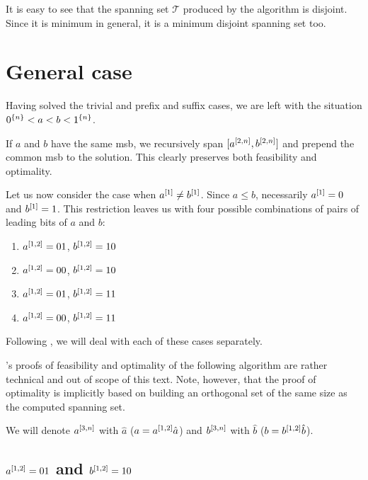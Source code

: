 It is easy to see that the spanning set $\mathcal{T}$
produced by the algorithm is disjoint.
Since it is minimum in general,
it is a minimum disjoint spanning set too.

\section{General case}

Having solved the trivial and prefix and suffix cases,
we are left with the situation
$0^{\{n\}} < a < b < 1^{\{n\}}$.

If $a$ and $b$ have the same \acrshort{msb},
we recursively span
$[a^{[2, n]}, b^{[2, n]}]$
and prepend the common \acrshort{msb}
to the solution.
This clearly preserves both feasibility and optimality.

Let us now consider the case when
$a^{[1]} \neq b^{[1]}$.
Since $a \leq b$,
necessarily $a^{[1]} = 0$
and $b^{[1]} = 1$.
This restriction leaves us with
four possible combinations of pairs
of leading bits of $a$ and $b$:

\begin{enumerate}
\item $a^{[1, 2]} = 01$, $b^{[1, 2]} = 10$
\item $a^{[1, 2]} = 00$, $b^{[1, 2]} = 10$
\item $a^{[1, 2]} = 01$, $b^{[1, 2]} = 11$
\item $a^{[1, 2]} = 00$, $b^{[1, 2]} = 11$
\end{enumerate}

Following \citet{Schieber2005154},
we will deal with each of these cases separately.

\citeauthor{Schieber2005154}'s proofs of feasibility
and optimality of the following
algorithm are rather technical and out of scope
of this text.
Note, however, that the proof of optimality is implicitly
based on building an orthogonal set of the same size
as the computed spanning set.

We will denote $a^{[3, n]}$ with $\hat{a}$
($a = a^{[1, 2]} \hat{a}$)
and $b^{[3, n]}$ with $\hat{b}$
($b = b^{[1, 2]} \hat{b}$).

\subsection{\texorpdfstring
{$a^{[1, 2]} = 01$ and $b^{[1, 2]} = 10$}
{ = 01 and  = 10}
}

